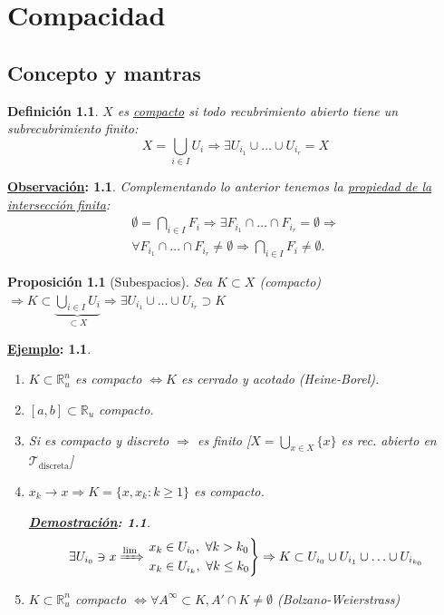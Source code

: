 \documentclass[10pt,a4paper,openright]{book}
\theoremstyle{break}
\newtheorem*{defi}{Definición}
\newtheorem*{prop}{Proposición}
\newtheorem*{demo}{\underline{Demostración}:}
\newtheorem*{obs}{\underline{Observación}:}
\newtheorem*{ej}{\underline{Ejemplo}:}
\begin{document}
\chapter{Compacidad}%
\label{cha:compacidad}
\section{Concepto y mantras}%
\label{sec:concepto_y_mantras_comp}
\begin{defi}
$X$ es \underline{compacto} si todo recubrimiento abierto tiene un subrecubrimiento finito:
\[
X = \bigcup_{i \in  I} U_i \Rightarrow \exists U_{i_1} \cup \ldots \cup U_{i_r} = X
\]
\end{defi}

\begin{obs}
Complementando lo anterior tenemos la \underline{propiedad de la intersección finita}: 
\begin{gather*}
    \emptyset = \bigcap_{i \in I} F_i \Rightarrow \exists F_{i_1} \cap \ldots \cap F_{i_r} = \emptyset \Rightarrow\\
    \forall F_{i_1} \cap \ldots \cap F_{i_r} \neq \emptyset \Rightarrow \bigcap_{i \in  I} F_i \neq \emptyset
.\end{gather*}
\end{obs}

\begin{prop}[Subespacios]
Sea $K \subset X$ (compacto) $\Rightarrow K \subset \underbrace{\bigcup_{i \in  I} U_i}_{\subset X} \Rightarrow \exists U_{i_1} \cup \ldots \cup U_{i_r} \supset K$
\end{prop}

\begin{ej}
\begin{enumerate}
    \item $K \subset \mathbb{R}_u^n$ es compacto $\Leftrightarrow K$ es cerrado y acotado (Heine-Borel). 
    \item $\left[ a, b \right] \subset \mathbb{R}_u$ compacto.
    \item Si es compacto y discreto $\Rightarrow$ es finito [$X = \bigcup_{x \in X} \{x\}$ es rec. abierto en $\mathcal{T}_{\text{discreta}}$]
    \item $x_k \rightarrow x \Rightarrow K = \{x, x_k: k \ge 1\}$ es compacto.
    \begin{demo}
        \[
            \exists U_{i_0} \ni x \xRightarrow{\lim} \begin{rcases}
                x_k \in U_{i_0},\ \forall k > k_0\\
                x_k \in U_{i_k},\ \forall k \le k_0
            \end{rcases} \Rightarrow K \subset U_{i_0} \cup U_{i_1} \cup \ldots \cup U_{i_{k_0}} 
        \]
    \end{demo}

    \item $K \subset \mathbb{R}_u^n$ compacto $\Leftrightarrow \forall A^{\infty} \subset K, A' \cap K \neq \emptyset$ (Bolzano-Weierstrass)
\end{enumerate}
\end{ej}
\end{document}
